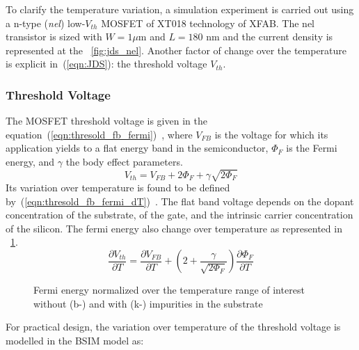 To clarify the temperature variation, a simulation experiment is carried out using a n-type (\emph{nel}) low-\(V_{th}\) MOSFET of XT018 technology of XFAB\@. The nel transistor is sized with \(W = 1 \mu \)m and \(L=180\) nm and the current density is represented at the \figurename~\ref{fig:jds_nel}. Another factor of change over the temperature is explicit in~(\ref{eqn:JDS}): the threshold voltage \(V_{th} \).

\subsubsection{Threshold Voltage}      %
\label{sec:threshold}
The MOSFET threshold voltage is given in the equation~(\ref{eqn:thresold_fb_fermi})~\cite{Sze2006}, where \(V_{FB} \) is the voltage for which its application yields to a flat energy band in the semiconductor, \(\Phi_F \) is the Fermi energy, and \(\gamma \) the body effect parameters.
\begin{equation}
\label{eqn:thresold_fb_fermi}
V_{th} = V_{FB} + 2 \Phi_F + \gamma \sqrt{2 \Phi_F}
\end{equation}
Its variation over temperature is found to be defined by~(\ref{eqn:thresold_fb_fermi_dT})~\cite{Filanovsky2001}. The flat band voltage depends on the dopant concentration of the substrate, of the gate, and the intrinsic carrier concentration of the silicon. The fermi energy also change over temperature as represented in \figurename~\ref{fig:electron_fermi_si}.
\begin{equation}
    \label{eqn:thresold_fb_fermi_dT}
    \frac{\partial V_{th}}{\partial T} = \frac{\partial V_{FB}}{\partial T} + \left( 2  + \frac{\gamma}{\sqrt{2 \Phi_F}} \right) \frac{\partial \Phi_F}{\partial T}
\end{equation}

\begin{figure}[!ht]
    \centering
    
    \caption{Fermi energy normalized over the temperature range of interest without (b-) and with (k-) impurities in the substrate}
    \label{fig:electron_fermi_si}
\end{figure}

For practical design, the variation over temperature of the threshold voltage is modelled in the BSIM model as:

